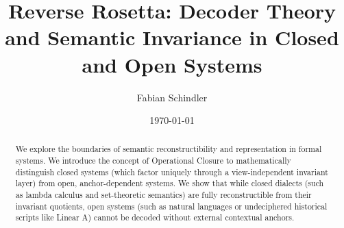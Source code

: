 \documentclass{report}
\title{Reverse Rosetta: Decoder Theory and Semantic Invariance in Closed and Open Systems}
\author{Fabian Schindler}
\date{\today}
\begin{document}
\maketitle

\begin{abstract}
We explore the boundaries of semantic reconstructibility and representation in formal systems. We introduce the concept of Operational Closure to mathematically distinguish closed systems (which factor uniquely through a view-independent invariant layer) from open, anchor-dependent systems. We show that while closed dialects (such as lambda calculus and set-theoretic semantics) are fully reconstructible from their invariant quotients, open systems (such as natural languages or undeciphered historical scripts like Linear A) cannot be decoded without external contextual anchors.
\end{abstract}


\end{document}
